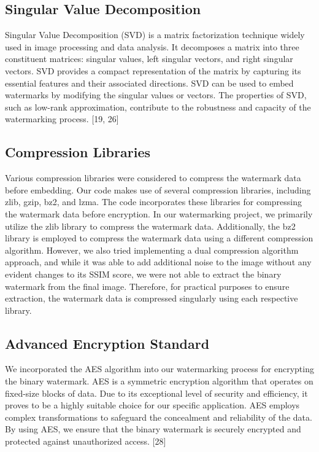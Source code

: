 \documentclass[conference]{IEEEtran}
\begin{document}
\subsection{Singular Value Decomposition}
Singular Value Decomposition (SVD) is a matrix factorization technique widely used in image processing and data analysis. It decomposes a matrix into three constituent matrices: singular values, left singular vectors, and right singular vectors. SVD provides a compact representation of the matrix by capturing its essential features and their associated directions. SVD can be used to embed watermarks by modifying the singular values or vectors. The properties of SVD, such as low-rank approximation, contribute to the robustness and capacity of the watermarking process. [19, 26]

\subsection{Compression Libraries}
Various compression libraries were considered to compress the watermark data before embedding. Our code makes use of several compression libraries, including zlib, gzip, bz2, and lzma. The code incorporates these libraries for compressing the watermark data before encryption. In our watermarking project, we primarily utilize the zlib library to compress the watermark data. Additionally, the bz2 library is employed to compress the watermark data using a different compression algorithm. However, we also tried implementing a dual compression algorithm approach, and while it was able to add additional noise to the image without any evident changes to its SSIM score, we were not able to extract the binary watermark from the final image. Therefore, for practical purposes to ensure extraction, the watermark data is compressed singularly using each respective library.



\subsection{Advanced Encryption Standard}
We incorporated the AES algorithm into our watermarking process for encrypting the binary watermark. AES is a symmetric encryption algorithm that operates on fixed-size blocks of data. Due to its exceptional level of security and efficiency, it proves to be a highly suitable choice for our specific application. AES employs complex transformations to safeguard the concealment and reliability of the data. By using AES, we ensure that the binary watermark is securely encrypted and protected against unauthorized access. [28]
\end{document}
